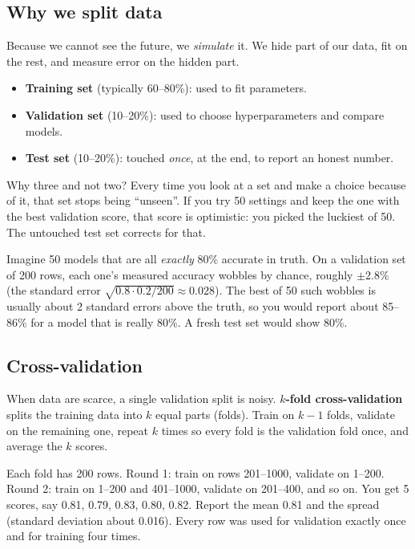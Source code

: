 \subsection{Why we split data}
Because we cannot see the future, we \emph{simulate} it. We hide part of our data, fit on the rest, and
measure error on the hidden part.
\begin{itemize}
\item \textbf{Training set} (typically 60--80\%): used to fit parameters.
\item \textbf{Validation set} (10--20\%): used to choose hyperparameters and compare models.
\item \textbf{Test set} (10--20\%): touched \emph{once}, at the end, to report an honest number.
\end{itemize}
Why three and not two? Every time you look at a set and make a choice because of it, that set stops being
``unseen''. If you try 50 settings and keep the one with the best validation score, that score is
optimistic: you picked the luckiest of 50. The untouched test set corrects for that.

\begin{example}
Imagine 50 models that are all \emph{exactly} 80\% accurate in truth. On a validation set of 200 rows,
each one's measured accuracy wobbles by chance, roughly $\pm 2.8\%$ (the standard error
$\sqrt{0.8\cdot0.2/200}\approx 0.028$). The best of 50 such wobbles is usually about 2 standard errors
above the truth, so you would report about 85--86\% for a model that is really 80\%. A fresh test set would
show 80\%.
\end{example}

\subsection{Cross-validation}
When data are scarce, a single validation split is noisy. \textbf{$k$-fold cross-validation} splits the
training data into $k$ equal parts (folds). Train on $k-1$ folds, validate on the remaining one, repeat $k$
times so every fold is the validation fold once, and average the $k$ scores.

\begin{example}
Each fold has 200 rows. Round 1: train on rows 201--1000, validate on 1--200. Round 2: train on 1--200 and
401--1000, validate on 201--400, and so on. You get 5 scores, say 0.81, 0.79, 0.83, 0.80, 0.82. Report the
mean 0.81 and the spread (standard deviation about 0.016). Every row was used for validation exactly once and
for training four times.
\end{example}

